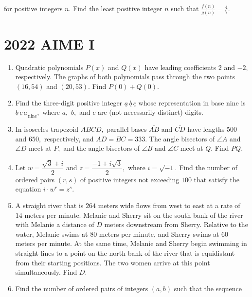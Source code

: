 \documentclass{article}
\begin{document}
\begin{enumerate}[label=\arabic*., itemsep=0.5em]
for positive integers $n$. Find the least positive integer $n$ such that $\tfrac{f(n)}{g(n)} = \tfrac{4}{7}$.\par \vspace{0.5em}\end{enumerate}\newpage\section*{2022 AIME I}\begin{enumerate}[label=\arabic*., itemsep=0.5em]\item Quadratic polynomials $P(x)$ and $Q(x)$ have leading coefficients $2$ and $-2,$ respectively. The graphs of both polynomials pass through the two points $(16,54)$ and $(20,53).$ Find $P(0) + Q(0).$\par \vspace{0.5em}\item Find the three-digit positive integer $\underline{a}\,\underline{b}\,\underline{c}$ whose representation in base nine is $\underline{b}\,\underline{c}\,\underline{a}_{\,\text{nine}},$ where $a,$ $b,$ and $c$ are (not necessarily distinct) digits.\par \vspace{0.5em}\item In isosceles trapezoid $ABCD,$ parallel bases $\overline{AB}$ and $\overline{CD}$ have lengths $500$ and $650,$ respectively, and $AD=BC=333.$ The angle bisectors of $\angle A$ and $\angle D$ meet at $P,$ and the angle bisectors of $\angle B$ and $\angle C$ meet at $Q.$ Find $PQ.$\par \vspace{0.5em}\item Let $w = \dfrac{\sqrt{3} + i}{2}$ and $z = \dfrac{-1 + i\sqrt{3}}{2},$ where $i = \sqrt{-1}.$ Find the number of ordered pairs $(r,s)$ of positive integers not exceeding $100$ that satisfy the equation $i \cdot w^r = z^s.$\par \vspace{0.5em}\item A straight river that is $264$ meters wide flows from west to east at a rate of $14$ meters per minute. Melanie and Sherry sit on the south bank of the river with Melanie a distance of $D$ meters downstream from Sherry. Relative to the water, Melanie swims at $80$ meters per minute, and Sherry swims at $60$ meters per minute. At the same time, Melanie and Sherry begin swimming in straight lines to a point on the north bank of the river that is equidistant from their starting positions. The two women arrive at this point simultaneously. Find $D.$\par \vspace{0.5em}\item Find the number of ordered pairs of integers $(a,b)$ such that the sequence 

\end{enumerate}
\end{document}
